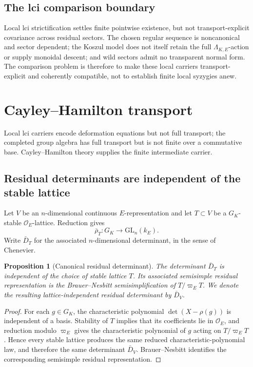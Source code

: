 \documentclass[11pt]{article}
\newtheorem{proposition}[theorem]{Proposition}
\theoremstyle{definition}
\begin{document}
\subsection{The lci comparison boundary}

Local lci strictification settles finite pointwise existence, but not transport-explicit covariance across residual sectors.  The chosen regular sequence is noncanonical and sector dependent; the Koszul model does not itself retain the full $\Lambda_{K,E}$-action or supply monoidal descent; and wild sectors admit no transparent normal form.  The comparison problem is therefore to make these local carriers transport-explicit and coherently compatible, not to establish finite local syzygies anew.


\section{Cayley--Hamilton transport}\label{sec:ch-carrier}

Local lci carriers encode deformation equations but not full transport; the completed group algebra has full transport but is not finite over a commutative base.  Cayley--Hamilton theory supplies the finite intermediate carrier.

\subsection{Residual determinants are independent of the stable lattice}

Let $V$ be an $n$-dimensional continuous $E$-representation and let $T\subset V$ be a $G_K$-stable $\mathcal O_E$-lattice.  Reduction gives
\[
\bar\rho_T:G_K\longrightarrow \mathrm{GL}_n(k_E).
\]
Write $\bar D_T$ for the associated $n$-dimensional determinant, in the sense of Chenevier.

\begin{proposition}[Canonical residual determinant]\label{prop:residual-determinant-independent}
The determinant $\bar D_T$ is independent of the choice of stable lattice $T$.  Its associated semisimple residual representation is the Brauer--Nesbitt semisimplification of $T/\varpi_ET$.  We denote the resulting lattice-independent residual determinant by $\bar D_V$.
\end{proposition}

\begin{proof}
For each $g\in G_K$, the characteristic polynomial $\det(X-\rho(g))$ is independent of a basis.  Stability of $T$ implies that its coefficients lie in $\mathcal O_E$, and reduction modulo $\varpi_E$ gives the characteristic polynomial of $g$ acting on $T/\varpi_ET$.  Hence every stable lattice produces the same reduced characteristic-polynomial law, and therefore the same determinant $\bar D_V$.  Brauer--Nesbitt identifies the corresponding semisimple residual representation.
\end{proof}
\end{document}
